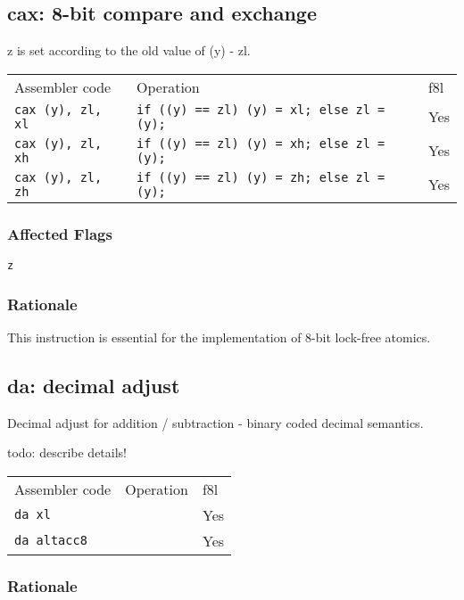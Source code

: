 \documentclass{book}
\begin{document}
\subsection{cax: 8-bit compare and exchange}

z is set according to the old value of (y) - zl.

\begin{tabular}{l l l}
Assembler code            & Operation                                        & f8l \\
\texttt{cax (y), zl, xl}  & \texttt{if ((y) == zl) (y) = xl; else zl = (y);} & Yes \\
\texttt{cax (y), zl, xh}  & \texttt{if ((y) == zl) (y) = xh; else zl = (y);} & Yes \\
\texttt{cax (y), zl, zh}  & \texttt{if ((y) == zl) (y) = zh; else zl = (y);} & Yes
\end{tabular}

\subsubsection*{Affected Flags}

\texttt{z}

\subsubsection*{Rationale}

This instruction is essential for the implementation of 8-bit lock-free atomics.

\subsection{da: decimal adjust}

Decimal adjust for addition / subtraction - binary coded decimal semantics.

todo: describe details!

\begin{tabular}{l l l}
Assembler code      & Operation & f8l \\
\texttt{da xl}      &           & Yes \\
\texttt{da altacc8} &           & Yes \\
\end{tabular}

\subsubsection*{Rationale}
\end{document}
